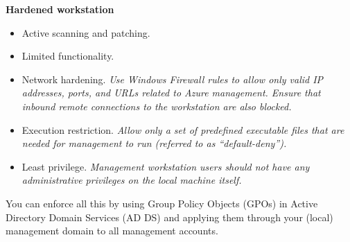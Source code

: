 \textbf{Hardened workstation}
\begin{itemize}
\item Active scanning and patching.
\item Limited functionality.
\item Network hardening. \textit{Use Windows Firewall rules to allow only valid IP addresses, ports, and URLs related to Azure management. Ensure that inbound remote connections to the workstation are also blocked.}
\item Execution restriction. \textit{Allow only a set of predefined executable files that are needed for management to run (referred to as “default-deny”).}
\item Least privilege. \textit{Management workstation users should not have any administrative privileges on the local machine itself. }
\end{itemize}
You can enforce all this by using Group Policy Objects (GPOs) in Active Directory Domain Services (AD DS) and applying them through your (local) management domain to all management accounts.

